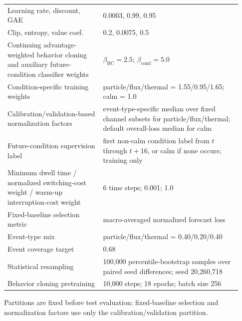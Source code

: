 \begin{table}[htbp]
\begin{tabular}{@{}p{0.38\linewidth}p{0.55\linewidth}@{}}
    Learning rate, discount, GAE & 0.0003, 0.99, 0.95 \\
    Clip, entropy, value coef. & 0.2, 0.0075, 0.5 \\
    Continuing advantage-weighted behavior cloning and auxiliary future-condition classifier weights & $\beta_{\mathrm{BC}}=2.5$; $\beta_{\mathrm{cond}}=5.0$ \\
    Condition-specific training weights & particle/flux/thermal = 1.55/0.95/1.65; calm = 1.0 \\
    Calibration/validation-based normalization factors & event-type-specific median over fixed channel subsets for particle/flux/thermal; default overall-loss median for calm \\
    Future-condition supervision label & first non-calm condition label from $t$ through $t+16$, or calm if none occurs; training only \\
    Minimum dwell time / normalized switching-cost weight / warm-up interruption-cost weight & 6 time steps; 0.001; 1.0 \\
    Fixed-baseline selection metric & macro-averaged normalized forecast loss \\
    Event-type mix & particle/flux/thermal = 0.40/0.20/0.40 \\
    Event coverage target & 0.68 \\
    Statistical resampling & 100,000 percentile-bootstrap samples over paired seed differences; seed 20,260,718 \\
    Behavior cloning pretraining & 10,000 steps; 18 epochs; batch size 256 \\
    \bottomrule
  \end{tabular}
  \vspace{0.2ex}

  \noindent\scriptsize
  Partitions are fixed before test evaluation; fixed-baseline selection and
  normalization factors use only the calibration/validation partition.
\end{table}

